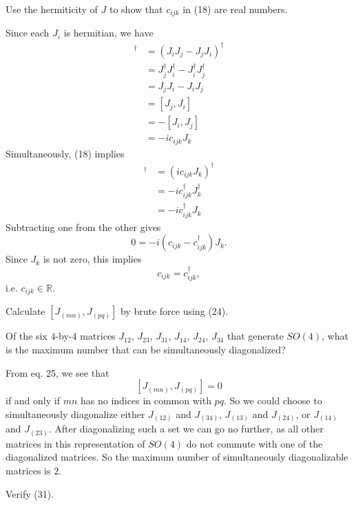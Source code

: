 \documentclass[../group-theory-in-a-nutshell-for-physicists.tex]{subfiles}
\begin{document}
\begin{questions}
\question Use the hermiticity of $J$ to show that $c_{ijk}$ in (18) are real
numbers.

\begin{solution}
	Since each $J_i$ is hermitian, we have
	\begin{align*}
		[J_i, J_j]^\dagger &= (J_iJ_j - J_jJ_i)^\dagger \\
		&= J_j^\dagger J_i^\dagger - J_i^\dagger J_j^\dagger \\
		&= J_jJ_i - J_iJ_j \\
		&= [J_j, J_i] \\
		&= -[J_i, J_j] \\
		&= -ic_{ijk}J_k
	\end{align*}
	Simultaneously, (18) implies
	\begin{align*}
		[J_i, J_j]^\dagger &= (ic_{ijk}J_k)^\dagger \\
		&= -ic_{ijk}^\dagger J_k^\dagger \\
		&= -ic_{ijk}^\dagger J_k
	\end{align*}
	Subtracting one from the other gives
	\[
		0 = -i(c_{ijk} - c^\dagger_{ijk})J_k.
	\]
	Since $J_k$ is not zero, this implies
	\[
		c_{ijk} = c^\dagger_{ijk},
	\]
	i.e. $c_{ijk} \in \mathbb{R}$.
\end{solution}

\question Calculate $[J_{(mn)},J_{(pq)}]$ by brute force using
(24).

\question Of the six $4$-by-$4$ matrices $J_{12}$, $J_{23}$, \(J_{31}\),
$J_{14}$, $J_{24}$, $J_{34}$ that generate $SO(4)$, what is the
maximum number that can be simultaneously diagonalized?

\begin{solution}
	From eq. 25, we see that
	\[
		[J_{(mn)}, J_{(pq)}] = 0
	\]
	if and only if $mn$ has no indices in common with $pq$. So we could choose to simultaneously diagonalize either $J_{(12)}$ and $J_{(34)}$, $J_{(13)}$ and $J_{(24)}$, or $J_{(14)}$ and $J_{(23)}$. After diagonalizing such a set we can go no further, as all other matrices in this representation of $SO(4)$ do not commute with one of the diagonalized matrices. So the maximum number of simultaneously diagonalizable matrices is $2$.
\end{solution}

\question Verify (31).


\end{questions}
\end{document}

